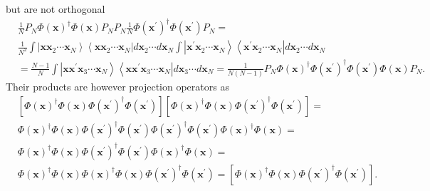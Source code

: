\documentclass[aps,preprint]{revtex4}%
\begin{document}
but are not orthogonal
\begin{align}
&  \frac{1}{N}P_{N}\Phi\left(  \mathbf{x}\right)  ^{\dagger}\Phi\left(
\mathbf{x}\right)  P_{N}P_{N}\frac{1}{N}\Phi\left(  \mathbf{x}^{\prime
}\right)  ^{\dagger}\Phi\left(  \mathbf{x}^{\prime}\right)  P_{N}=\nonumber\\
&  \frac{1}{N^{2}}\int\left\vert \mathbf{xx}_{2}\cdots\mathbf{x}%
_{N}\right\rangle \left\langle \mathbf{xx}_{2}\cdots\mathbf{x}_{N}\right\vert
d\mathbf{x}_{2}\cdots d\mathbf{x}_{N}\int\left\vert \mathbf{x}^{\prime
}\mathbf{x}_{2}\cdots\mathbf{x}_{N}\right\rangle \left\langle \mathbf{x}%
^{\prime}\mathbf{x}_{2}\cdots\mathbf{x}_{N}\right\vert d\mathbf{x}_{2}\cdots
d\mathbf{x}_{N}\nonumber\\
&  =\frac{N-1}{N}\int\left\vert \mathbf{x\mathbf{x}^{\prime}x}_{3}%
\cdots\mathbf{x}_{N}\right\rangle \left\langle \mathbf{x\mathbf{x}^{\prime}%
x}_{3}\cdots\mathbf{x}_{N}\right\vert d\mathbf{x}_{3}\cdots d\mathbf{x}%
_{N}=\frac{1}{N\left(  N-1\right)  }P_{N}\Phi\left(  \mathbf{x}\right)
^{\dagger}\Phi\left(  \mathbf{x}^{\prime}\right)  ^{\dagger}\Phi\left(
\mathbf{x}^{\prime}\right)  \Phi\left(  \mathbf{x}\right)  P_{N}.
\end{align}
Their products are however projection operators as
\begin{align}
&  \left[  \Phi\left(  \mathbf{x}\right)  ^{\dagger}\Phi\left(  \mathbf{x}%
\right)  \Phi\left(  \mathbf{x}^{\prime}\right)  ^{\dagger}\Phi\left(
\mathbf{x}^{\prime}\right)  \right]  \left[  \Phi\left(  \mathbf{x}\right)
^{\dagger}\Phi\left(  \mathbf{x}\right)  \Phi\left(  \mathbf{x}^{\prime
}\right)  ^{\dagger}\Phi\left(  \mathbf{x}^{\prime}\right)  \right]
=\nonumber\\
&  \Phi\left(  \mathbf{x}\right)  ^{\dagger}\Phi\left(  \mathbf{x}\right)
\Phi\left(  \mathbf{x}^{\prime}\right)  ^{\dagger}\Phi\left(  \mathbf{x}%
^{\prime}\right)  \Phi\left(  \mathbf{x}^{\prime}\right)  ^{\dagger}%
\Phi\left(  \mathbf{x}^{\prime}\right)  \Phi\left(  \mathbf{x}\right)
^{\dagger}\Phi\left(  \mathbf{x}\right)  =\nonumber\\
&  \Phi\left(  \mathbf{x}\right)  ^{\dagger}\Phi\left(  \mathbf{x}\right)
\Phi\left(  \mathbf{x}^{\prime}\right)  ^{\dagger}\Phi\left(  \mathbf{x}%
^{\prime}\right)  \Phi\left(  \mathbf{x}\right)  ^{\dagger}\Phi\left(
\mathbf{x}\right)  =\nonumber\\
&  \Phi\left(  \mathbf{x}\right)  ^{\dagger}\Phi\left(  \mathbf{x}\right)
\Phi\left(  \mathbf{x}\right)  ^{\dagger}\Phi\left(  \mathbf{x}\right)
\Phi\left(  \mathbf{x}^{\prime}\right)  ^{\dagger}\Phi\left(  \mathbf{x}%
^{\prime}\right)  =\left[  \Phi\left(  \mathbf{x}\right)  ^{\dagger}%
\Phi\left(  \mathbf{x}\right)  \Phi\left(  \mathbf{x}^{\prime}\right)
^{\dagger}\Phi\left(  \mathbf{x}^{\prime}\right)  \right]  .
\end{align}
\end{document}
